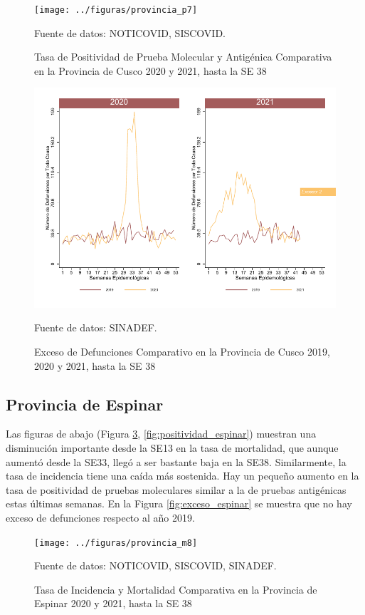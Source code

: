 \documentclass[12pt,a4paper,openany]{book}
\begin{document}
	\begin{figure}[h]
	\caption{Tasa de Positividad de Prueba Molecular y Antigénica Comparativa en la Provincia de Cusco 2020 y 2021, hasta la SE 38}\label{fig:positividad_cusco}
	\begin{center}
		\texttt{[image: ../figuras/provincia\_p7]}
	\end{center}
	{\footnotesize {Fuente de datos: NOTICOVID, SISCOVID.}}
	\end{figure}

	\begin{figure}[h]
	\caption{Exceso de Defunciones Comparativo en la Provincia de Cusco 2019, 2020 y 2021, hasta la SE 38}\label{fig:exceso_cusco}
	\begin{center}
		\includegraphics[width=0.7\linewidth]{../figuras/exceso_7}
	\end{center}
	{\footnotesize {Fuente de datos: SINADEF.}}
	\end{figure}

\clearpage

	\subsection*{Provincia de Espinar}
	\noindent Las figuras de abajo (Figura \ref{fig:inc_mort_espinar}, \ref{fig:positividad_espinar})  muestran una disminución importante desde la SE13 en la tasa de mortalidad, que aunque aumentó desde la SE33, llegó a ser bastante baja en la SE38. Similarmente, la tasa de incidencia tiene una caída más sostenida. Hay un pequeño aumento en la tasa de positividad de pruebas moleculares similar a la de pruebas antigénicas estas últimas semanas. En la Figura \ref{fig:exceso_espinar} se muestra que no hay exceso de defunciones respecto al año 2019.

	\begin{figure}[h]
	\caption{Tasa de Incidencia y Mortalidad Comparativa en la Provincia de Espinar 2020 y 2021, hasta la SE 38}\label{fig:inc_mort_espinar}
	\begin{center}
		\texttt{[image: ../figuras/provincia\_m8]}
	\end{center}
	{\footnotesize {Fuente de datos: NOTICOVID, SISCOVID, SINADEF.}}
	\end{figure}
\end{document}
